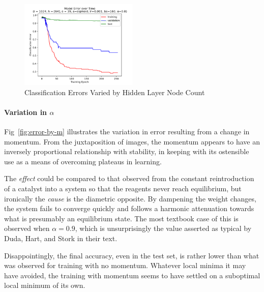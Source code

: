\documentclass[10pt,epsf]{article}
\begin{document}
{{\begin{figure}[H]
      \includegraphics[width=0.5\textwidth]{./img/64-0.001-160-0-sigmoid-1/error-255.png}
      \caption{Classification Errors Varied by Hidden Layer Node Count}
      \label{fig:error-by-nh}
    \end{figure}
    \paragraph{Variation in $\alpha$}{
      Fig~\ref{fig:error-by-m} illustrates the variation in error resulting from a change in
      momentum. From the juxtaposition of images, the momentum appears to have an inversely
      proportional relationship with stability, in keeping with its ostensible use as a means
      of overcoming plateaus in learning.

      The \emph{effect} could be compared to that observed from the constant reintroduction of a catalyst
      into a system so that the reagents never reach equilibrium, but ironically the \emph{cause} is the
      diametric opposite. By dampening the weight changes, the system fails to converge quickly
      and follows a harmonic attenuation towards what is presumably an equilibrium state.
      The most textbook case of this is observed when $\alpha = 0.9$, which is unsurprisingly
      the value asserted as typical by Duda, Hart, and Stork in their text\autocite[314]{DHS}.

      Disappointingly, the final accuracy, even in the test set, is rather lower than what
      was observed for training with no momentum. Whatever local minima it may have avoided,
      the training with momentum seems to have settled on a suboptimal local minimum of its own.

}}}
\end{document}
